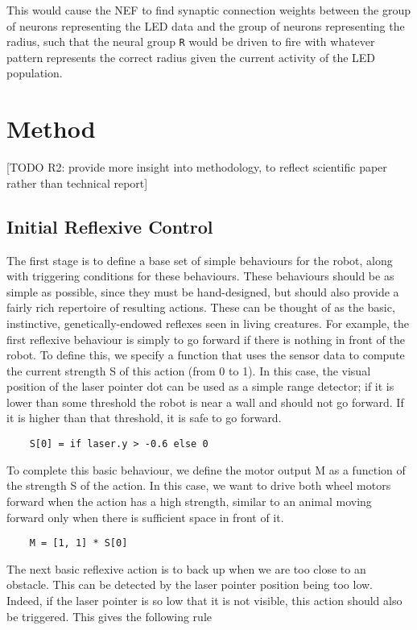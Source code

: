 \documentclass[conference]{IEEEtran}
\begin{document}
This would cause the NEF to find synaptic connection weights between the group of neurons representing the LED data and the group of neurons representing the radius, such that the neural group \texttt{R} would be driven to fire with whatever pattern represents the correct radius given the
current activity of the LED population.

\section{Method}
[TODO R2: provide more insight into methodology, to reflect scientific paper rather than technical report]

\subsection{Initial Reflexive Control}
The first stage is to define a base set of simple behaviours for the robot, along with triggering conditions for these behaviours. These behaviours should be as simple as possible, since they must be hand-designed, but should also provide a fairly rich repertoire of resulting actions. These can be thought of as the basic, instinctive, genetically-endowed reflexes seen in living creatures. For example, the first reflexive behaviour is simply to go forward if there is nothing in front of the robot. To define this, we specify a function that uses the sensor data to compute the current strength S of this action (from 0 to 1). In this case, the visual position of the laser pointer dot can be used as a simple range detector; if it is lower than some threshold the robot is near a wall and should not go forward. If it is higher than that threshold, it is safe to go forward. 
\begin{lstlisting}
	S[0] = if laser.y > -0.6 else 0
\end{lstlisting}

To complete this basic behaviour, we define the motor output M as a function of the strength S of the action. In this case, we want to drive both wheel motors forward when the action has a high strength, similar to an animal moving forward only when there is sufficient space in front of it.

\begin{lstlisting}
	M = [1, 1] * S[0]
\end{lstlisting}

The next basic reflexive action is to back up when we are
too close to an obstacle. This can be detected by the laser
pointer position being too low. Indeed, if the laser pointer is
so low that it is not visible, this action should also be
triggered. This gives the following rule
\end{document}
